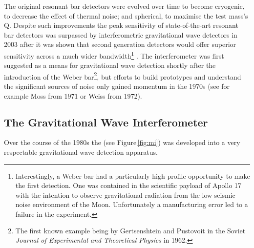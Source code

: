 The original resonant bar detectors were evolved over time to become cryogenic, to decrease the effect of thermal noise; and spherical, to maximise the test mass's Q. Despite such improvements the peak sensitivity of state-of-the-art resonant bar detectors was surpassed by interferometric gravitational wave detectors in 2003 \cite{Pitkin2011} after it was shown that second generation detectors would offer superior sensitivity across a much wider bandwidth\footnote{Interestingly, a Weber bar had a particularly high profile opportunity to make the first detection. One was contained in the scientific payload of Apollo 17 with the intention to observe gravitational radiation from the low seismic noise environment of the Moon. Unfortunately a manufacturing error led to a failure in the experiment.} \cite{Harry2002a}. The interferometer was first suggested as a means for gravitational wave detection shortly after the introduction of the Weber bar\footnote{The first known example being by Gertsenshtein and Pustovoit in the Soviet \emph{Journal of Experimental and Theoretical Physics} in 1962.}, but efforts to build prototypes and understand the significant sources of noise only gained momentum in the 1970s (see for example Moss \etal \cite{Moss1971} from 1971 or Weiss \cite{Weiss1972} from 1972).


\subsection{The Gravitational Wave Interferometer}

Over the course of the 1980s the \MI (see Figure\,\ref{fig:mi}) was developed into a very respectable gravitational wave detection apparatus.

